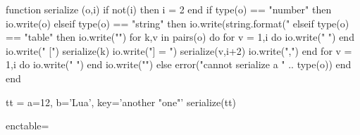 \documentclass{article}
\begin{document}
\begin{luacode*}


    function serialize (o,i)
      if not(i) then i = 2 end
      if type(o) == "number" then
        io.write(o)
      elseif type(o) == "string" then
        io.write(string.format("%
      elseif type(o) == "table" then
        io.write("{\n")
        for k,v in pairs(o) do
          for v = 1,i do
            io.write(" ")
          end
          io.write("  [")
          serialize(k)
          io.write("] = ")
          serialize(v,i+2)
          io.write(",\n")
        end
          for v = 1,i do
            io.write(" ")
          end
        io.write("}\n")
      else
        error("cannot serialize a " .. type(o))
      end
    end

    
  tt = {a=12, b='Lua', key='another "one"'}
  serialize(tt)
  
  
  enctable={}
  
\end{luacode*}

\makeatletter
\def\CSstring#1{%
  \string\\\expandafter\@gobble\string#1%
}
\makeatother


\def\ReadDeclareTextSymbol#1#2#3{%
  \luaprocess
    {\luastring{\unexpanded{#1}}}
    {\luastring{#2}}
    {#3}{symbol}
}
\def\ReadDeclareTextAccent#1#2#3{%
  \luaprocess
    {\luastring{\unexpanded{#1}}}
    {\luastring{#2}}
    {#3}{accent}
}
\def\ReadDeclareTextComposite#1#2#3#4{%
  \luaprocess
    {\luastring{\unexpanded{#1#3}}}
    {\luastring{#2}}
    {#4}{composite}
}
\def\ReadDeclareTextDoubleComposite#1#2#3#4#5{%
  \luaprocess
    {\luastring{\unexpanded{#1#3#4}}}
    {\luastring{#2}}
    {#5}{composite-dbl}
}
\DeclareDocumentCommand{}
\DeclareDocumentCommand{}
\def\luaprocess#1#2#3#4{%
  \directlua{
    if not( enctable[#1] ) then
      enctable[#1] = {}
    end
    enctable[#1][#2] = \number#3
  }
}


\begingroup
\makeatletter
\let\DeclareTextCommand\ReadDeclareTextCommand
\let\DeclareTextSymbol\ReadDeclareTextSymbol
\let\DeclareTextAccent\ReadDeclareTextAccent
\let\DeclareTextComposite\ReadDeclareTextComposite
\let\DeclareTextDoubleComposite\ReadDeclareTextDoubleComposite
\let\DeclareTextCompositeCommand\ReadDeclareTextCompositeCommand
\def\DeclareErrorFont#1#2#3#4#5{}
\def\DeclareFontEncoding#1#2#3{%
  \def\LastDeclaredEncoding{#1}%
}
\def\DeclareFontSubstitution#1#2#3#4{}
\def\DeclareTextSymbolDefault#1#2{}
\def\NeedsTeXFormat#1[#2]{}










    
\end{document}
